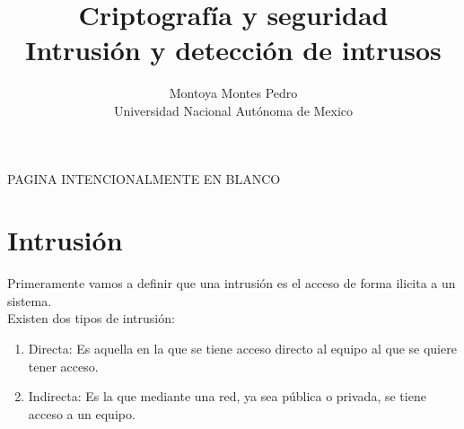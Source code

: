 \documentclass[11pt,a4paper]{article}
\begin{document}
\title{Criptografía y seguridad\\Intrusión y detección de intrusos}
\author{Montoya Montes Pedro\\
		Universidad Nacional Autónoma de Mexico}
\maketitle
\tableofcontents

\newpage
\begin{center}
PAGINA INTENCIONALMENTE EN BLANCO
\end{center}

\newpage
\section{Intrusión}
Primeramente vamos a definir que una intrusión es el acceso de forma ilicita a un sistema.\\
Existen dos tipos de intrusión:
\begin{enumerate}
	\item Directa: Es aquella en la que se tiene acceso directo al equipo al que se quiere tener acceso.
	\item Indirecta: Es la que mediante una red, ya sea pública o privada, se tiene acceso a un equipo.
\end{enumerate}
\end{document}
